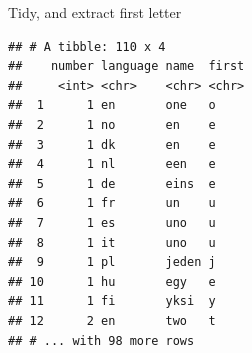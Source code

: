 \documentclass[
  ignorenonframetext,
]{beamer}
\newenvironment{Shaded}{\begin{snugshade}}{\end{snugshade}}
\newcommand{\DataTypeTok}[1]{\textcolor[rgb]{0.13,0.29,0.53}{#1}}
\newcommand{\DecValTok}[1]{\textcolor[rgb]{0.00,0.00,0.81}{#1}}
\newcommand{\KeywordTok}[1]{\textcolor[rgb]{0.13,0.29,0.53}{\textbf{#1}}}
\newcommand{\NormalTok}[1]{#1}
\newcommand{\OperatorTok}[1]{\textcolor[rgb]{0.81,0.36,0.00}{\textbf{#1}}}
\newcommand{\StringTok}[1]{\textcolor[rgb]{0.31,0.60,0.02}{#1}}
\begin{document}
\begin{frame}[fragile]{Tidy, and extract first letter}
\protect\hypertarget{tidy-and-extract-first-letter}{}

\footnotesize

\begin{Shaded}
\end{Shaded}

\begin{verbatim}
## # A tibble: 110 x 4
##    number language name  first
##     <int> <chr>    <chr> <chr>
##  1      1 en       one   o    
##  2      1 no       en    e    
##  3      1 dk       en    e    
##  4      1 nl       een   e    
##  5      1 de       eins  e    
##  6      1 fr       un    u    
##  7      1 es       uno   u    
##  8      1 it       uno   u    
##  9      1 pl       jeden j    
## 10      1 hu       egy   e    
## 11      1 fi       yksi  y    
## 12      2 en       two   t    
## # ... with 98 more rows
\end{verbatim}

\normalsize

\end{frame}
\end{document}
